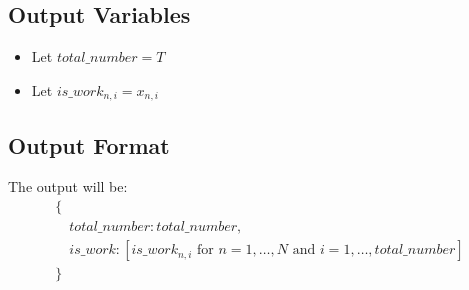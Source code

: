 \documentclass{article}
\begin{document}
\subsection*{Output Variables}
\begin{itemize}
    \item Let $total\_number = T$
    \item Let $is\_work_{n,i} = x_{n,i}$
\end{itemize}

\subsection*{Output Format}
The output will be:
\[
\begin{align*}
\{ \\
\quad total\_number: total\_number, \\
\quad is\_work: [is\_work_{n,i} \text{ for } n = 1, \ldots, N \text{ and } i = 1, \ldots, total\_number] \\
\}
\end{align*}
\]
\end{document}
